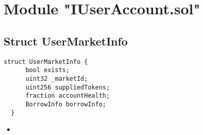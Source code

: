 
\section{Module "IUserAccount.sol"}

\subsection{Struct UserMarketInfo}

\begin{lstlisting}[firstnumber=10]
  struct UserMarketInfo {
      bool exists;
      uint32 _marketId;
      uint256 suppliedTokens;
      fraction accountHealth;
      BorrowInfo borrowInfo;
  }
  \end{lstlisting}

\noindent\begin{itemize}
  \item {}
\end{itemize}